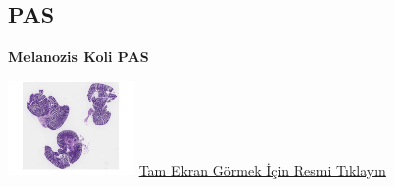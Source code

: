 \documentclass[
  letterpaper,
  DIV=11,
  numbers=noendperiod]{scrreprt}
\begin{document}
\hypertarget{pas-2}{%
\subsection{PAS}\label{pas-2}}

\textbf{Melanozis Koli PAS}

\href{https://images.patolojiatlasi.com/melanosiscoli/PAS.html}{\includegraphics[width=0.25\textwidth,height=\textheight]{./screenshots/melanosiscoli-PAS_screenshot.png}}
\href{https://images.patolojiatlasi.com/melanosiscoli/PAS.html}{Tam
Ekran Görmek İçin Resmi Tıklayın}



\printindex
\end{document}
